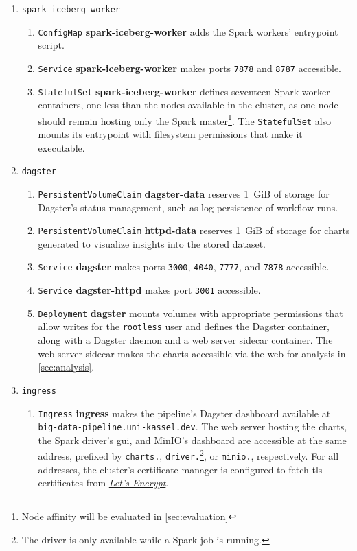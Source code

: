 \begin{enumerate}
  \item \texttt{spark-iceberg-worker}
  \begin{enumerate}
    \item \texttt{ConfigMap} \textbf{spark-iceberg-worker} adds the Spark workers' entrypoint script.
    \item \texttt{Service} \textbf{spark-iceberg-worker} makes ports \texttt{7878} and \texttt{8787} accessible.
    \item \texttt{StatefulSet} \textbf{spark-iceberg-worker} defines seventeen Spark worker containers, one less than the nodes available in the cluster, as one node should remain hosting only the Spark master\footnote{Node affinity will be evaluated in \cref{sec:evaluation}}. The \texttt{StatefulSet} also mounts its entrypoint with filesystem permissions that make it executable.
  \end{enumerate}

  \item \texttt{dagster}
  \begin{enumerate}
    \item \texttt{PersistentVolumeClaim} \textbf{dagster-data} reserves 1~GiB of storage for Dagster's status management, such as log persistence of workflow runs.
    \item \texttt{PersistentVolumeClaim} \textbf{httpd-data} reserves 1~GiB of storage for charts generated to visualize insights into the stored dataset.
    \item \texttt{Service} \textbf{dagster} makes ports \texttt{3000}, \texttt{4040}, \texttt{7777}, and \texttt{7878} accessible.
    \item \texttt{Service} \textbf{dagster-httpd} makes port \texttt{3001} accessible.
    \item \texttt{Deployment} \textbf{dagster} mounts volumes with appropriate permissions that allow writes for the \texttt{rootless} user and defines the Dagster container, along with a Dagster daemon and a web server sidecar container. The web server sidecar makes the charts accessible via the web for analysis in \cref{sec:analysis}.
  \end{enumerate}

  \item \texttt{ingress}
  \begin{enumerate}
    \item \texttt{Ingress} \textbf{ingress} makes the pipeline's Dagster dashboard available at \newline\texttt{big-data-pipeline.uni-kassel.dev}. The web server hosting the charts, the Spark driver's \ac{gui}, and MinIO's dashboard are accessible at the same address, prefixed by \texttt{charts.}, \texttt{driver.}\footnote{The driver is only available while a Spark job is running.}, or \texttt{minio.}, respectively. For all addresses, the cluster's certificate manager is configured to fetch \ac{tls} certificates from \href{https://letsencrypt.org/}{\textit{Let's Encrypt}}.
  \end{enumerate}
\end{enumerate}
